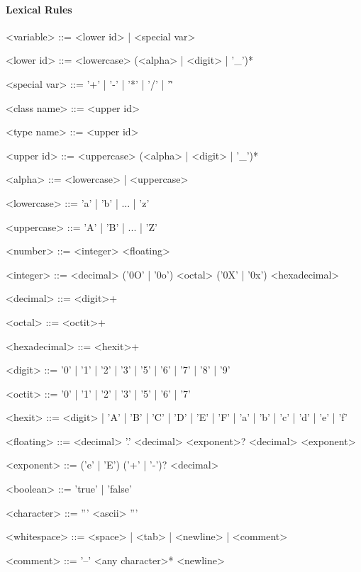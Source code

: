 \paragraph{Lexical Rules}
\begin{grammar}
<variable>       ::=    <lower id> | <special var>

<lower id>       ::=    <lowercase> (<alpha> | <digit> | '\_')*

<special var>    ::=    '+' | '-' | '*' | '/' | '\^'

<class name>     ::=    <upper id>

<type name>      ::=    <upper id>

<upper id>       ::=    <uppercase> (<alpha> | <digit> | '_')*

<alpha>          ::=    <lowercase> | <uppercase>

<lowercase>      ::=    'a' | 'b' | ... | 'z'

<uppercase>      ::=    'A' | 'B' | ... | 'Z'

<number>         ::=    <integer>
                 \alt     <floating>

<integer>        ::=    <decimal>
                 \alt    ('0O' | '0o') <octal>
                 \alt    ('0X' | '0x') <hexadecimal>

<decimal>        ::=    <digit>+

<octal>          ::=    <octit>+

<hexadecimal>    ::=    <hexit>+

<digit>          ::=    '0' | '1' | '2' | '3' | '5' | '6' | '7' | '8' | '9'

<octit>          ::=    '0' | '1' | '2' | '3' | '5' | '6' | '7'

<hexit>          ::=    <digit> | 'A' | 'B' | 'C' | 'D' | 'E' | 'F' | 'a' | 'b' | 'c' | 'd' | 'e' | 'f'

<floating>       ::=    <decimal> '.' <decimal> <exponent>?
                 \alt     <decimal> <exponent>

<exponent>       ::=    ('e' | 'E') ('+' | '-')? <decimal>

<boolean>        ::=    'true' | 'false'

<character>      ::=    ''' <ascii> '''

<whitespace>     ::=    <space> | <tab> | <newline> | <comment>

<comment>        ::=    '--' <any character>* <newline>
\end{grammar}
